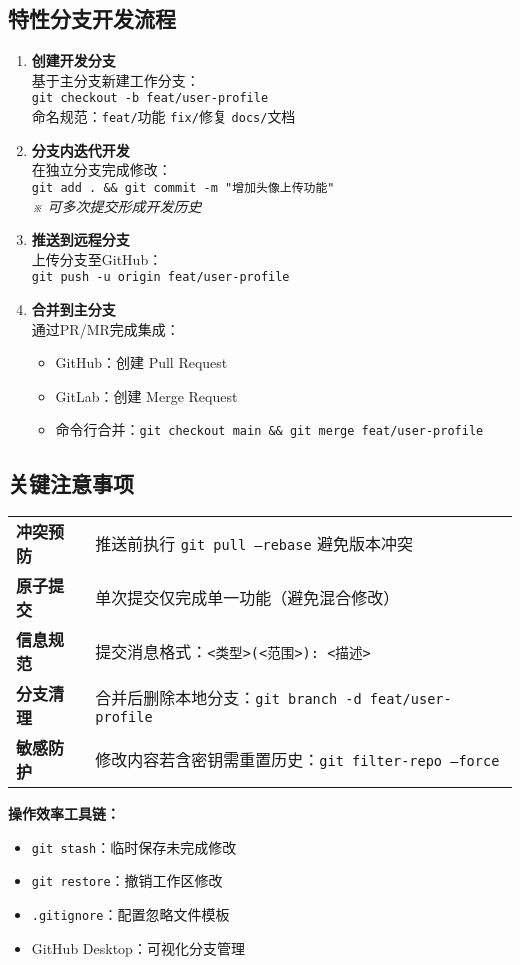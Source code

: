\subsection{特性分支开发流程}
\begin{enumerate}[leftmargin=*, nosep]
\item \textbf{创建开发分支} \\
基于主分支新建工作分支：\\
\texttt{git checkout -b feat/user-profile} \\
命名规范：\texttt{feat/}功能 \texttt{fix/}修复 \texttt{docs/}文档

\item \textbf{分支内迭代开发} \\
在独立分支完成修改：\\
\texttt{git add . \&\& git commit -m "增加头像上传功能"} \\
\textit{※ 可多次提交形成开发历史}

\item \textbf{推送到远程分支} \\
上传分支至GitHub：\\
\texttt{git push -u origin feat/user-profile}

\item \textbf{合并到主分支} \\
通过PR/MR完成集成：\\
\begin{itemize}[leftmargin=*]
\item GitHub：创建 Pull Request
\item GitLab：创建 Merge Request
\item 命令行合并：\texttt{git checkout main \&\& git merge feat/user-profile}
\end{itemize}
\end{enumerate}

\subsection{关键注意事项}
\begin{tabular}{p{}p{}}
\textbf{冲突预防} & 推送前执行 \texttt{git pull --rebase} 避免版本冲突 \\
\textbf{原子提交} & 单次提交仅完成单一功能（避免混合修改） \\
\textbf{信息规范} & 提交消息格式：\texttt{<类型>(<范围>): <描述>} \\
\textbf{分支清理} & 合并后删除本地分支：\texttt{git branch -d feat/user-profile} \\
\textbf{敏感防护} & 修改内容若含密钥需重置历史：\texttt{git filter-repo --force} \\
\end{tabular}

\vspace{1em}
\textbf{操作效率工具链：}
\begin{itemize}[leftmargin=*, nosep]
\item \texttt{git stash}：临时保存未完成修改
\item \texttt{git restore}：撤销工作区修改
\item \texttt{.gitignore}：配置忽略文件模板
\item GitHub Desktop：可视化分支管理
\end{itemize}
